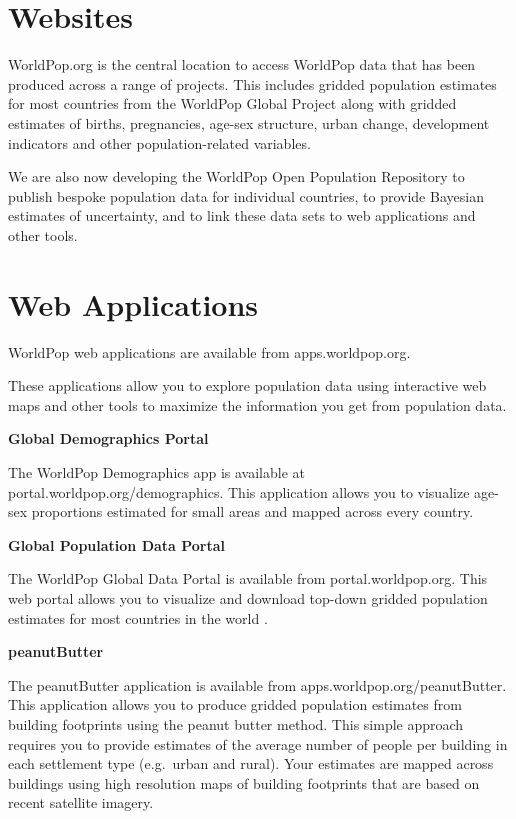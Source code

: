 \documentclass[]{book}
\begin{document}
\section{Websites}\label{websites}

WorldPop.org is the central location to access WorldPop data that has
been produced across a range of projects. This includes gridded
population estimates for most countries from the WorldPop Global Project
\citeyearpar[WorldPop et al][]{worldpop2018global} along with gridded
estimates of births, pregnancies, age-sex structure, urban change,
development indicators and other population-related variables.

We are also now developing the WorldPop Open Population Repository to
publish bespoke population data for individual countries, to provide
Bayesian estimates of uncertainty, and to link these data sets to web
applications and other tools.

\section{Web Applications}\label{web-applications}

WorldPop web applications are available from apps.worldpop.org.

These applications allow you to explore population data using
interactive web maps and other tools to maximize the information you get
from population data.

\textbf{Global Demographics Portal}

The WorldPop Demographics app is available at
portal.worldpop.org/demographics. This application allows you to
visualize age-sex proportions estimated for small areas and mapped
across every country.

\textbf{Global Population Data Portal}

The WorldPop Global Data Portal is available from portal.worldpop.org.
This web portal allows you to visualize and download top-down gridded
population estimates for most countries in the world
\citeyearpar[WorldPop et al][]{worldpop2018global}.

\textbf{peanutButter}

The peanutButter application \citep{leasure2020peanutButter} is
available from apps.worldpop.org/peanutButter. This application allows
you to produce gridded population estimates from building footprints
using the peanut butter method. This simple approach requires you to
provide estimates of the average number of people per building in each
settlement type (e.g.~urban and rural). Your estimates are mapped across
buildings using high resolution maps of building footprints
\citep{ecopia2020digitize} that are based on recent satellite imagery.
\end{document}
